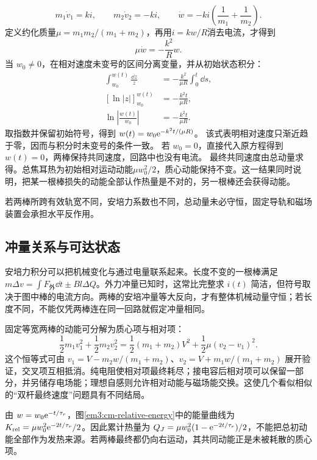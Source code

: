 \[
 m_1\dot v_1=ki,\qquad m_2\dot v_2=-ki,\qquad
 \dot w=-k i\left(\frac1{m_1}+\frac1{m_2}\right).
\]
定义约化质量$\mu=m_1m_2/(m_1+m_2)$，再用$i=kw/R$消去电流，才得到
\[
 \mu\dot w=-\frac{k^2}{R}w.
\]
当 $w_0\ne0$，在相对速度未变号的区间分离变量，并从初始状态积分：
\begin{align*}
\int_{w_0}^{w(t)}\frac{\dd z}{z}
&=-\frac{k^2}{\mu R}\int_0^t\dd s,\\
\left[\ln|z|\right]_{w_0}^{w(t)}
&=-\frac{k^2t}{\mu R},\\
\ln\left|\frac{w(t)}{w_0}\right|
&=-\frac{k^2t}{\mu R}.
\end{align*}
取指数并保留初始符号，得到 $w(t)=w_0\mathrm e^{-k^2t/(\mu R)}$。
该式表明相对速度只渐近趋于零，因而与积分时未变号的条件一致。
若 $w_0=0$，直接代入原方程得到 $w(t)=0$，两棒保持共同速度，回路中也没有电流。
最终共同速度由总动量求得。总焦耳热为初始相对运动动能$\mu w_0^2/2$，质心动能保持不变。这一结果同时说明，把某一根棒损失的动能全部认作热量是不对的，另一根棒还会获得动能。


若两棒所跨有效轨宽不同，安培力系数也不同，总动量未必守恒，固定导轨和磁场装置会承担水平反作用。



\subsection{冲量关系与可达状态}

安培力积分可以把机械变化与通过电量联系起来。长度不变的一根棒满足 $m\Delta v=\int F_{\text{外}}\dd t\pm Bl\Delta Q$。外力冲量已知时，这常比完整求 $i(t)$ 简洁，但符号取决于图中棒的电流方向。两棒的安培冲量等大反向，才有整体机械动量守恒；若长度不同，不能仅凭两棒连在同一回路就假定冲量相同。


固定等宽两棒的动能可分解为质心项与相对项：
\[\frac12m_1v_1^2+\frac12m_2v_2^2=\frac12(m_1+m_2)V^2+\frac12\mu(v_2-v_1)^2.\]
这个恒等式可由 $v_1=V-m_2w/(m_1+m_2)$、$v_2=V+m_1w/(m_1+m_2)$ 展开验证，交叉项互相抵消。纯电阻使相对项最终耗尽；接电容后相对项可以保留一部分，并另储存电场能；理想自感则允许相对动能与磁场能交换。这使几个看似相似的“双杆最终速度”问题具有不同结局。


由 $w=w_0\mathrm e^{-t/\tau_r}$，图\ref{em3:cm-relative-energy}中的能量曲线为 $K_{\rm rel}=\mu w_0^2\mathrm e^{-2t/\tau_r}/2$。因此累计热量为 $Q_J=\mu w_0^2(1-\mathrm e^{-2t/\tau_r})/2$，不能把总初动能全部作为发热来源。若两棒最终都仍向右运动，其共同动能正是未被耗散的质心项。



